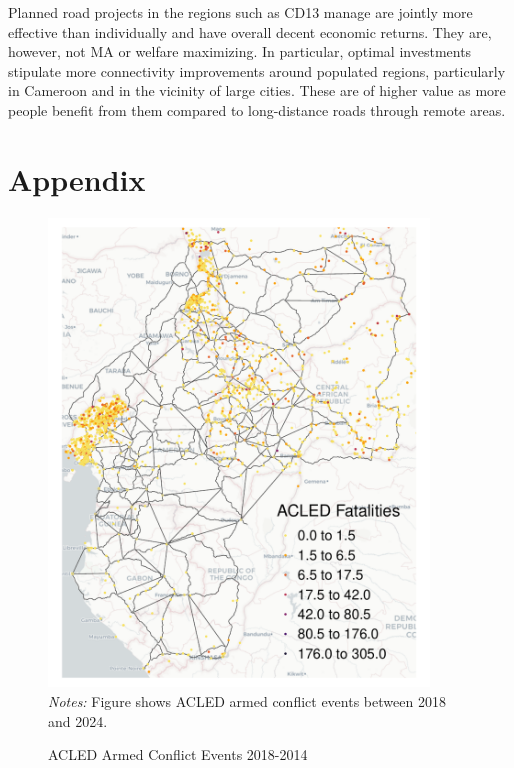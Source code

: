 \documentclass[a4paper]{article}
\begin{document}
 Planned road projects in the regions such as CD13 manage are jointly more effective than individually and have overall decent economic returns. They are, however, not MA or welfare maximizing. In particular, optimal investments stipulate more connectivity improvements around populated regions, particularly in Cameroon and in the vicinity of large cities. These are of higher value as more people benefit from them compared to long-distance roads through remote areas. 



\newpage



\newpage
\section*{Appendix}

\begin{figure}[H] \vspace{-1mm}
\centering
\caption{\label{fig:ACLED} ACLED Armed Conflict Events 2018-2014} 
\vspace{2mm}
\includegraphics[width=0.9\textwidth]{"../figures/trans_CEMAC_network_ACLED.pdf"} \\
\scriptsize 
\emph{Notes:} Figure shows ACLED \citep{raleigh2023political} armed conflict events between 2018 and 2024.
\end{figure}
\end{document}
